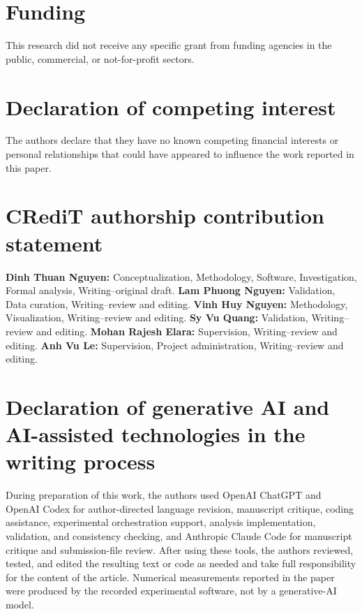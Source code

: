 \documentclass[a4paper,fleqn]{cas-dc}
\begin{document}
\section*{Funding}

This research did not receive any specific grant from funding agencies in the public, commercial, or not-for-profit sectors.

\section*{Declaration of competing interest}

The authors declare that they have no known competing financial interests or personal relationships that could have appeared to influence the work reported in this paper.

\section*{CRediT authorship contribution statement}

\textbf{Dinh Thuan Nguyen:} Conceptualization, Methodology, Software, Investigation, Formal analysis, Writing--original draft. \textbf{Lam Phuong Nguyen:} Validation, Data curation, Writing--review and editing. \textbf{Vinh Huy Nguyen:} Methodology, Visualization, Writing--review and editing. \textbf{Sy Vu Quang:} Validation, Writing--review and editing. \textbf{Mohan Rajesh Elara:} Supervision, Writing--review and editing. \textbf{Anh Vu Le:} Supervision, Project administration, Writing--review and editing.

\section*{Declaration of generative AI and AI-assisted technologies in the writing process}

During preparation of this work, the authors used OpenAI ChatGPT and OpenAI Codex for author-directed language revision, manuscript critique, coding assistance, experimental orchestration support, analysis implementation, validation, and consistency checking, and Anthropic Claude Code for manuscript critique and submission-file review. After using these tools, the authors reviewed, tested, and edited the resulting text or code as needed and take full responsibility for the content of the article. Numerical measurements reported in the paper were produced by the recorded experimental software, not by a generative-AI model.



\end{document}
